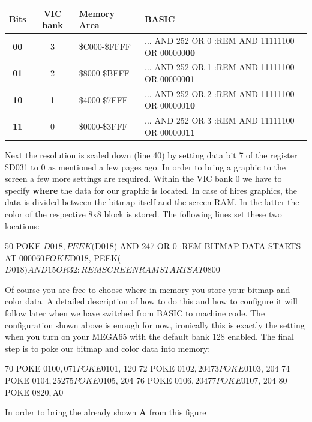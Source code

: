\begin{tabular}{|c|c|l|l|}
	\hline
	Bits & VIC bank & Memory Area & BASIC \\
	\hline
	 \textbf{00} & 3 & \$C000-\$FFFF & ... AND 252 OR 0 :REM AND 11111100 OR 000000\textbf{00} \\
	 \textbf{01} & 2 & \$8000-\$BFFF & ... AND 252 OR 1 :REM AND 11111100 OR 000000\textbf{01} \\
	 \textbf{10} & 1 & \$4000-\$7FFF & ... AND 252 OR 2 :REM AND 11111100 OR 000000\textbf{10} \\
	 \textbf{11} & 0 & \$0000-\$3FFF & ... AND 252 OR 3 :REM AND 11111100 OR 000000\textbf{11} \\
	\hline
\end{tabular}

Next the resolution is scaled down (line 40) by setting data bit 7 of the register \$D031 to 0 as mentioned a few
pages ago.  In order to bring a graphic to the screen a few more settings are required. Within the VIC bank 0
we have to specify \textbf{where} the data for our graphic is located. In case of hires graphics, the data is divided between the
bitmap itself and the screen RAM.  In the latter the color of the respective 8x8 block is stored. The following lines
set these two locations:

\begin{screenoutput}
50 POKE $D018, PEEK($D018) AND 247 OR 0 :REM BITMAP DATA STARTS AT $0000
60 POKE $D018, PEEK($D018) AND 15 OR 32 :REM SCREEN RAM STARTS AT $0800
\end{screenoutput}

Of course you are free to choose where in memory you store your bitmap and color data. A detailed description of how to do this and how to configure it will follow later when we have switched from BASIC to machine code. 
The configuration shown above is enough for now, ironically this is exactly the setting when you turn on your MEGA65 with the default bank 128 enabled. The final step is to poke our bitmap and color data into memory:

\begin{screenoutput}
70 POKE $0100, 0
71 POKE $0101, 120
72 POKE $0102, 204
73 POKE $0103, 204
74 POKE $0104, 252
75 POKE $0105, 204
76 POKE $0106, 204
77 POKE $0107, 204
80 POKE $0820, $A0
\end{screenoutput}
	
In order to bring the already shown \textbf{A} from this figure

